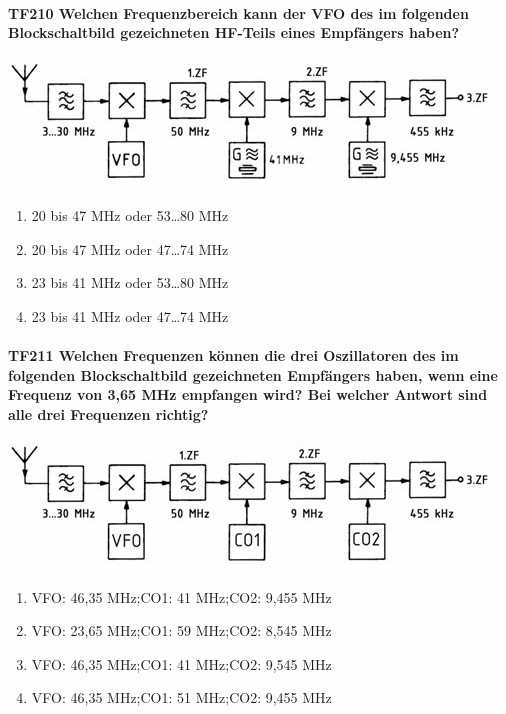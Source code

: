 \documentclass[8pt]{article}
\begin{document}
\begin{enumerate}
\paragraph*{TF210 Welchen Frequenzbereich kann der VFO des im folgenden Blockschaltbild gezeichneten HF-Teils eines Empfängers haben?}
\begin{center}
	\begin{minipage}{\linewidth}
		\centering
		\includegraphics[scale=1.0]{pics/tf210_a.jpg}
	\end{minipage}
\end{center}
\begin{enumerate}[nolistsep,label=\Alph*]
\item 20 bis 47 MHz oder 53…80 MHz
\item 20 bis 47 MHz oder 47…74 MHz
\item 23 bis 41 MHz oder 53…80 MHz
\item 23 bis 41 MHz oder 47…74 MHz
\end{enumerate}

\paragraph*{TF211 Welchen Frequenzen können die drei Oszillatoren des im folgenden Blockschaltbild gezeichneten Empfängers haben, wenn eine Frequenz von 3,65 MHz empfangen wird? Bei welcher Antwort sind alle drei Frequenzen richtig?}
\begin{center}
	\begin{minipage}{\linewidth}
		\centering
		\includegraphics[scale=1.0]{pics/tf211_a.jpg}
	\end{minipage}
\end{center}
\begin{enumerate}[nolistsep,label=\Alph*]
\item VFO: 46,35 MHz;CO1: 41 MHz;CO2: 9,455 MHz
\item VFO: 23,65 MHz;CO1: 59 MHz;CO2: 8,545 MHz
\item VFO: 46,35 MHz;CO1: 41 MHz;CO2: 9,545 MHz
\item VFO: 46,35 MHz;CO1: 51 MHz;CO2: 9,455 MHz
\end{enumerate}


\end{enumerate}
\end{document}
